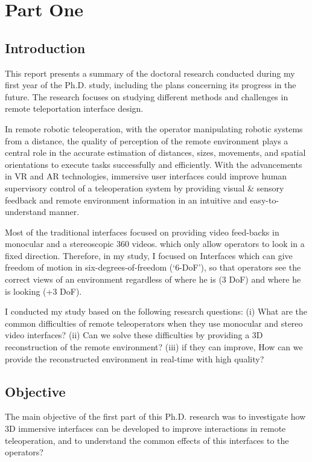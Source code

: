 \chapter{Part One}
\section{Introduction}
This report presents a summary of the doctoral research conducted during my first year of the Ph.D. study, including the plans concerning its progress in the future. The research focuses on studying different methods and challenges in remote teleportation interface design.

In remote robotic teleoperation, with the operator manipulating robotic systems from a distance, the quality of perception of the remote environment plays a central role in the accurate estimation of distances, sizes, movements, and spatial orientations to execute tasks successfully and efficiently. With the advancements in VR and AR technologies, immersive user interfaces could improve human supervisory control of a teleoperation system by providing visual & sensory feedback and remote environment information in an intuitive and easy-to-understand manner.

Most of the traditional interfaces focused on providing video feed-backs in monocular and a stereoscopic 360 videos. which only allow operators to look in a fixed direction. Therefore, in my study, I focused on Interfaces which can give freedom of motion in six-degrees-of-freedom (‘6-DoF’), so that operators see the correct views of an environment regardless of where he is (3 DoF) and where he is looking (+3 DoF).

I conducted my study based on the following research questions: (i) What are the common difficulties of remote teleoperators when they use monocular and stereo video interfaces? (ii) Can we solve these difficulties by providing a 3D reconstruction of the remote environment? (iii) if they can improve, How can we provide the reconstructed environment in real-time with high quality?


\section{Objective}

The main objective of the first part of this Ph.D. research was to investigate how 3D immersive interfaces can be developed to improve interactions in remote teleoperation, and to understand the common effects of this interfaces to the operators?

